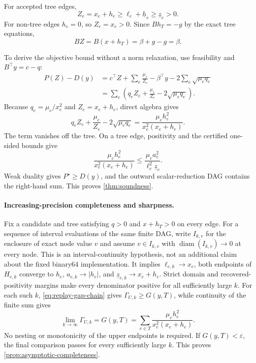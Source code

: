 For accepted tree edges,
\begin{equation}
 Z_e=x_e+h_e\ge\ell_e+\underline h_e
 \ge\underline z_e>0.
\end{equation}
For non-tree edges $h_e=0$, so $Z_e=x_e>0$.  Since $Bh_T=-g$ by the exact tree
equations,
\begin{equation}
 BZ=B(x+h_T)=\beta+g-g=\beta.
\end{equation}

To derive the objective bound without a norm relaxation, use feasibility and
$B^\top y=c-q$:
\begin{align}
 P(Z)-D(y)
 &=c^\top Z+\sum_e\frac{\mu_e}{Z_e}
 -\beta^\top y-2\sum_e\sqrt{\mu_eq_e} \\
 &=\sum_e\left(q_eZ_e+\frac{\mu_e}{Z_e}
 -2\sqrt{\mu_eq_e}\right).
\end{align}
Because $q_e=\mu_e/x_e^2$ and $Z_e=x_e+h_e$, direct algebra gives
\begin{equation}
 q_eZ_e+\frac{\mu_e}{Z_e}-2\sqrt{\mu_eq_e}
 =\frac{\mu_eh_e^2}{x_e^2(x_e+h_e)}.
\end{equation}
 The term vanishes off the tree.  On a tree edge, positivity and the certified
 one-sided bounds give
\begin{equation}
 \frac{\mu_eh_e^2}{x_e^2(x_e+h_e)}
 \le\frac{\mu_ea_e^2}{\ell_e^2\underline z_e}.
\end{equation}
Weak duality gives $P^\star\ge D(y)$, and the outward scalar-reduction DAG
contains the right-hand sum.  This proves \cref{thm:soundness}.

\paragraph{Increasing-precision completeness and sharpness.}
Fix a candidate and tree satisfying $q>0$ and $x+h_T>0$ on every edge.  For a
sequence of interval evaluations of the same finite DAG, write $I_{k,v}$ for
the enclosure of exact node value $v$ and assume
$v\in I_{k,v}$ with $\operatorname{diam}(I_{k,v})\to0$ at every node.  This is
an interval-continuity hypothesis, not an additional claim about the fixed
binary64 implementation.  It implies $\ell_{e,k}\to x_e$, both endpoints of
$H_{e,k}$ converge to $h_e$, $a_{e,k}\to|h_e|$, and
$\underline z_{e,k}\to x_e+h_e$.  Strict domain and recovered-positivity
margins make every denominator positive for all sufficiently large $k$.
For each such $k$, \cref{eq:replay-gap-chain} gives
$\Gamma_{U,k}\ge G(y,T)$, while continuity of the finite sum gives
\[
 \lim_{k\to\infty}\Gamma_{U,k}
 =G(y,T)=\sum_{e\in T}\frac{\mu_eh_e^2}{x_e^2(x_e+h_e)}.
\]
No nesting or monotonicity of the upper endpoints is required.  If
$G(y,T)<\varepsilon$, the final comparison passes for every sufficiently large
$k$.  This proves \cref{prop:asymptotic-completeness}.

